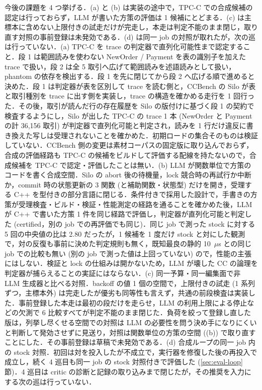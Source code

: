 \documentclass[submit,techrep,noauthor]{ipsj}
\begin{document}
今後の課題を 4 つ挙げる．(a) と (b) は実装の途中で，TPC-C での合成候補の認定は行っておらず，LLM が書いた方策の評価は 1 候補にとどまる．(c) は主標本に含めない上限付きの試走だけが完走し，本走は判定不能のまま閉じ，取り直す対照の事前登録は未発効である．(d) は同一 job の対照が取れたが，次の巡は行っていない．(a) TPC-C を trace の判定器で直列化可能性まで認定すること．段 1 は範囲読みを使わない NewOrder / Payment を表の識別子を加えた trace で扱い，段 2 は全 5 取引へ広げて範囲読みを述語読みとして扱い，phantom の依存を検出する．段 1 を先に閉じてから段 2 へ広げる順で進めると決めた．段 1 は判定器が表を区別して trace を読む側と，CCBench の Silo が表と取引種別を trace に出す側を実装し，trace の構造を確かめる走行を 1 回行った．その後，取引が読んだ行の存在履歴を Silo の版付けに基づく段 1 の契約で検査するようにし，Silo が出した TPC-C の trace 1 本 (NewOrder と Payment の計 36,156 取引) が判定器で直列化可能と判定され，読みを 1 行だけ違反に書き換えた写しは受理されないことを確かめた．初期ロードの集合そのものは検証していない．CCBench 側の変更は素材コーパスの固定版に取り込んでおらず，合成の評価経路も TPC-C の候補をビルドして評価する配線を持たないので，合成候補を TPC-C で認定・評価したことは無い．(b) LLM が関数単位で方策のコードを書く合成空間．Silo の abort 後の待機量，lock 競合時の再試行か中断か，commit 時の状態更新の 3 関数 (と補助関数・状態型) だけを開き，受理する C++ を型付きの部分言語に閉じる．条件付きで採用した設計で，手書きの方策が受理検査・ビルド・検証・性能測定の経路を通ることを確かめた後，LLM が C++ で書いた方策 1 件を同じ経路で評価し，判定器が直列化可能と判定した (certified，別の job での再評価でも同じ)．同じ job で測った stock に対する 5 回の中央値の比は 2.80 だったが，1 候補を 1 度だけ stock と対にした観測で，対の反復も事前に決めた判定規則も無く，既知最良の静的 10~$\mu$s との同じ job での比較も無い (別の job で測った値は上回っていない) ので，性能の主張にはしない．検証と lock の仕組みは開かないため，LLM が壊した CC の論理を判定器が捕らえることの実証にはならない．(c) 同一予算・同一編集面で非 LLM 生成器と比べる対照．backoff の値 1 個の空間で，上限付きの試走 (1 系列ずつ，主標本外) は完走したが優劣も同等性も言えず，共通の前段検査は実装した．事前登録した本走は最初の段だけを走らせ，LLM の利用上限による停止などの欠測で 6 比較すべてが判定不能のまま閉じた．負荷を絞って登録し直した版は，列挙し尽くせる空間での対照は LLM の必要性を問う決め手になりにくいと判断して発効させずに見送り，対照は関数単位の方策の空間 ((b)) で取り直すことにした．その事前登録は草稿で未発効である．(d) 合成ループの同一 job 内の stock 対照．初回は対を投入したが不成立で，実行器を修復した後の再投入で成立し，続く 4 巡目も同一 job の stock 対照付きで評価した (\ref{sec:eval-loop} 節)．4 巡目は critic の診断と記録の取り込みまで閉じたが，その推奨を入力にする次の巡は行っていない．
\end{document}
